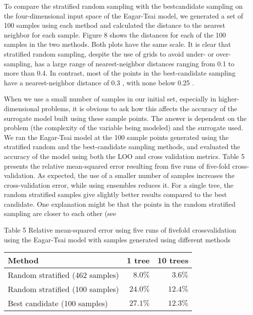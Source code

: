 \documentclass[10pt]{article}
\begin{document}
To compare the stratified random sampling with the bestcandidate sampling on the four-dimensional input space of the Eagar-Tsai model, we generated a set of 100 samples using each method and calculated the distance to the nearest neighbor for each sample. Figure 8 shows the distances for each of the 100 samples in the two methods. Both plots have the same scale. It is clear that stratified random sampling, despite the use of grids to avoid under- or over-sampling, has a large range of nearest-neighbor distances ranging from 0.1 to more than 0.4. In contrast, most of the points in the best-candidate sampling have a nearest-neighbor distance of 0.3 , with none below 0.25 .

When we use a small number of samples in our initial set, especially in higher-dimensional problems, it is obvious to ask how this affects the accuracy of the surrogate model built using these sample points. The answer is dependent on the problem (the complexity of the variable being modeled) and the surrogate used. We ran the Eagar-Tsai model at the 100 sample points generated using the stratified random and the best-candidate sampling methods, and evaluated the accuracy of the model using both the LOO and cross validation metrics. Table 5 presents the relative mean-squared error resulting from five runs of five-fold cross-validation. As expected, the use of a smaller number of samples increases the cross-validation error, while using ensembles reduces it. For a single tree, the random stratified samples give slightly better results compared to the best candidate. One explanation might be that the points in the random stratified sampling are closer to each other (see

Table 5 Relative mean-squared error using five runs of fivefold crossvalidation using the Eagar-Tsai model with samples generated using different methods

\begin{center}
\begin{tabular}{lrr}
\hline
Method & \multicolumn{1}{c}{1 tree} & 10 trees \\
\hline
Random stratified (462 samples) & $8.0 \%$ & $3.6 \%$ \\
Random stratified (100 samples) & $24.0 \%$ & $12.4 \%$ \\
Best candidate (100 samples) & $27.1 \%$ & $12.3 \%$ \\
\hline
\end{tabular}
\end{center}
\end{document}
